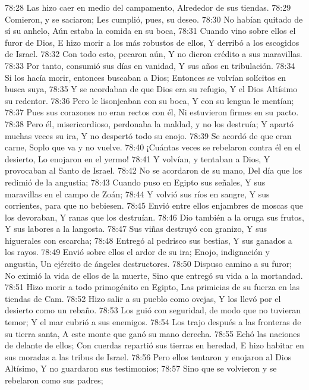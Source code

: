 78:28 Las hizo caer en medio del campamento, 
Alrededor de sus tiendas. 
78:29 Comieron, y se saciaron; 
Les cumplió, pues, su deseo. 
78:30 No habían quitado de sí su anhelo, 
Aún estaba la comida en su boca, 
78:31 Cuando vino sobre ellos el furor de Dios, 
E hizo morir a los más robustos de ellos, 
Y derribó a los escogidos de Israel. 
78:32 Con todo esto, pecaron aún, 
Y no dieron crédito a sus maravillas. 
78:33 Por tanto, consumió sus días en vanidad, 
Y sus años en tribulación. 
78:34 Si los hacía morir, entonces buscaban a Dios; 
Entonces se volvían solícitos en busca suya, 
78:35 Y se acordaban de que Dios era su refugio, 
Y el Dios Altísimo su redentor. 
78:36 Pero le lisonjeaban con su boca, 
Y con su lengua le mentían; 
78:37 Pues sus corazones no eran rectos con él, 
Ni estuvieron firmes en su pacto. 
78:38 Pero él, misericordioso, perdonaba la maldad, y no los destruía; 
Y apartó muchas veces su ira, 
Y no despertó todo su enojo. 
78:39 Se acordó de que eran carne, 
Soplo que va y no vuelve. 
78:40 ¡Cuántas veces se rebelaron contra él en el desierto, 
Lo enojaron en el yermo! 
78:41 Y volvían, y tentaban a Dios, 
Y provocaban al Santo de Israel. 
78:42 No se acordaron de su mano, 
Del día que los redimió de la angustia; 
78:43 Cuando puso en Egipto sus señales, 
Y sus maravillas en el campo de Zoán; 
78:44 Y volvió sus ríos en sangre, 
Y sus corrientes, para que no bebiesen. 
78:45 Envió entre ellos enjambres de moscas  que los devoraban, 
Y ranas que los destruían. 
78:46 Dio también a la oruga sus frutos, 
Y sus labores a la langosta. 
78:47 Sus viñas destruyó con granizo, 
Y sus higuerales con escarcha; 
78:48 Entregó al pedrisco sus bestias, 
Y sus ganados a los rayos. 
78:49 Envió sobre ellos el ardor de su ira; 
Enojo, indignación y angustia, 
Un ejército de ángeles destructores. 
78:50 Dispuso camino a su furor; 
No eximió la vida de ellos de la muerte, 
Sino que entregó su vida a la mortandad. 
78:51 Hizo morir a todo primogénito en Egipto, 
Las primicias de su fuerza en las tiendas de Cam. 
78:52 Hizo salir a su pueblo como ovejas, 
Y los llevó por el desierto como un rebaño. 
78:53 Los guió con seguridad, de modo que no tuvieran temor; 
Y el mar cubrió a sus enemigos. 
78:54 Los trajo después a las fronteras de su tierra santa, 
A este monte que ganó su mano derecha. 
78:55 Echó las naciones de delante de ellos; 
Con cuerdas repartió sus tierras en heredad, 
E hizo habitar en sus moradas a las tribus de Israel. 
78:56 Pero ellos tentaron y enojaron al Dios Altísimo, 
Y no guardaron sus testimonios; 
78:57 Sino que se volvieron y se rebelaron como sus padres; 
